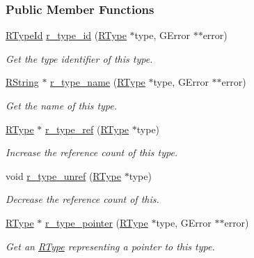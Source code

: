 \subsubsection*{Public Member Functions}
\begin{DoxyCompactItemize}
\item 
\hyperlink{type_8h_a200873d33e0b46e4ae64e4bfd4f7ac9d}{R\-Type\-Id} \hyperlink{struct_r_type_a40ec26771acf938d1d4fd4968272bf43}{r\-\_\-type\-\_\-id} (\hyperlink{struct_r_type}{R\-Type} $\ast$type, G\-Error $\ast$$\ast$error)
\begin{DoxyCompactList}\small\item\em Get the type identifier of this type. \end{DoxyCompactList}\item 
\hyperlink{struct_r_string}{R\-String} $\ast$ \hyperlink{struct_r_type_a3693f92b73c76634fd1ea78521bb4947}{r\-\_\-type\-\_\-name} (\hyperlink{struct_r_type}{R\-Type} $\ast$type, G\-Error $\ast$$\ast$error)
\begin{DoxyCompactList}\small\item\em Get the name of this type. \end{DoxyCompactList}\item 
\hyperlink{struct_r_type}{R\-Type} $\ast$ \hyperlink{struct_r_type_a9796d0adc620247438780470f970d1fd}{r\-\_\-type\-\_\-ref} (\hyperlink{struct_r_type}{R\-Type} $\ast$type)
\begin{DoxyCompactList}\small\item\em Increase the reference count of this type. \end{DoxyCompactList}\item 
void \hyperlink{struct_r_type_abc901fe63aef5d4696ccd9bea136ea97}{r\-\_\-type\-\_\-unref} (\hyperlink{struct_r_type}{R\-Type} $\ast$type)
\begin{DoxyCompactList}\small\item\em Decrease the reference count of this. \end{DoxyCompactList}\item 
\hyperlink{struct_r_type}{R\-Type} $\ast$ \hyperlink{struct_r_type_ace0f37441c6f2d1a23f572269ac2d339}{r\-\_\-type\-\_\-pointer} (\hyperlink{struct_r_type}{R\-Type} $\ast$type, G\-Error $\ast$$\ast$error)
\begin{DoxyCompactList}\small\item\em Get an \hyperlink{struct_r_type}{R\-Type} representing a pointer to this type. \end{DoxyCompactList}\end{DoxyCompactItemize}


